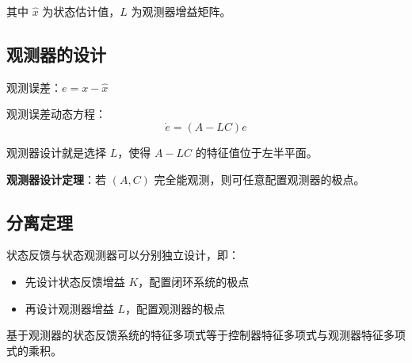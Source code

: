 \documentclass[12pt,a4paper]{article}
\begin{document}
其中 $\hat{x}$ 为状态估计值，$L$ 为观测器增益矩阵。

\subsection{观测器的设计}
观测误差：$e = x - \hat{x}$

观测误差动态方程：
\[\dot{e} = (A - LC)e\]

观测器设计就是选择 $L$，使得 $A - LC$ 的特征值位于左半平面。

\textbf{观测器设计定理}：若 $(A, C)$ 完全能观测，则可任意配置观测器的极点。

\subsection{分离定理}
状态反馈与状态观测器可以分别独立设计，即：
\begin{itemize}
    \item 先设计状态反馈增益 $K$，配置闭环系统的极点
    \item 再设计观测器增益 $L$，配置观测器的极点
\end{itemize}

基于观测器的状态反馈系统的特征多项式等于控制器特征多项式与观测器特征多项式的乘积。
\end{document}
